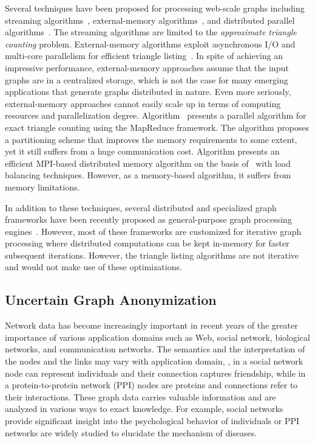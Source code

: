 Several techniques have been proposed for processing web-scale graphs including 
streaming algorithms~\cite{Becchetti_Boldi_Castillo_Gionis_2008,Buriol_Frahling_Leonardi_2006}, 
external-memory algorithms~\cite{H14,Kim_Han_Lee_Park_Yu_2014,GraphChi},
 and distributed parallel algorithms~\cite{Patric,Suri_Vassilvitskii_2011}. 
The streaming algorithms are limited to the {\em approximate triangle counting} problem. 
External-memory algorithms exploit asynchronous I/O and multi-core parallelism for efficient triangle listing~\cite{GraphChi,TurboGraph,H14}. 
In spite of achieving an impressive performance, external-memory approaches assume that the input graphs are in a centralized storage, 
which is not the case for many emerging applications that generate graphs distributed in nature. 
Even more seriously, external-memory approaches cannot easily scale up in terms of computing resources and parallelization degree.
Algorithm~\cite{Suri_Vassilvitskii_2011} presents a parallel algorithm for exact triangle counting using the MapReduce framework. 
The algorithm proposes a partitioning scheme that improves the memory requirements to some extent, yet it still suffers from a huge communication cost. 
Algorithm \cite{Patric} presents an efficient MPI-based distributed memory algorithm on the basis of~\cite{Suri_Vassilvitskii_2011} with load balancing techniques. 
However, as a memory-based algorithm, it suffers from memory limitations. 

In addition to these techniques, several distributed and specialized graph frameworks have been recently 
proposed as general-purpose graph processing engines~\cite{Pregel,PowerGraph,Gonzalez_Xin_Dave_Crankshaw_2014}.
However, most of these frameworks are  customized for iterative graph processing where distributed computations can be kept 
in-memory for faster subsequent iterations. However, the triangle listing algorithms are not iterative and would not make use of these optimizations. 

\subsection{Uncertain Graph Anonymization}
Network data has become increasingly important in recent years of the greater importance of various application domains such as Web, social network, biological networks, and communication networks. The semantics and the interpretation of the nodes and the links may vary with application domain, {\eg}, in a social network node can represent individuals and their connection captures friendship, while in a protein-to-protein network (PPI) nodes are proteins and connections refer to their interactions. These graph data carries valuable information and are analyzed in various ways to exact knowledge. For example, social networks provide significant insight into the psychological behavior of individuals or PPI networks are widely studied to elucidate the mechanism of diseases. 

